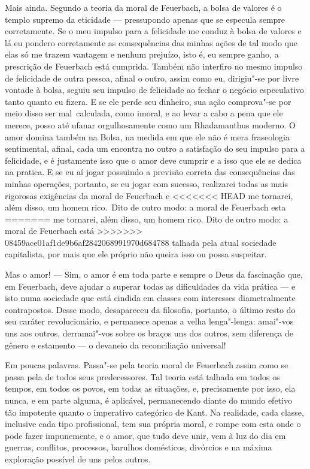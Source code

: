 Mais ainda. Segundo a teoria da moral %
de Feuerbach,
a bolsa de valores é o templo supremo da eticidade --- 
pressupondo apenas que se especula sempre corretamente. Se o meu impulso
para a felicidade me conduz à bolsa de valores e lá eu pondero
corretamente as consequências das minhas ações de tal modo que elas só
me trazem vantagem e nenhum prejuízo, isto é, eu sempre ganho, a
prescrição
de Feuerbach está
cumprida. Também não interfiro no mesmo impulso de felicidade de outra
pessoa, afinal o outro, assim como eu, dirigiu"-se por livre vontade à
bolsa, seguiu seu impulso de felicidade ao fechar o negócio especulativo
tanto quanto eu fizera. E se ele perde seu dinheiro, sua ação
comprova"-se por meio disso ser mal\est\ calculada, como imoral,
e ao levar a cabo a pena que ele merece, posso até
ufanar orgulhosamente como um Rhadamanthus moderno. O amor domina também
na Bolsa, na medida em que ele não é mera fraseologia sentimental,
afinal, cada um encontra no outro a satisfação do seu impulso para a
felicidade, e é justamente isso que o amor deve cumprir e a isso que ele
se dedica na pratica. E se eu aí jogar possuindo a previsão correta das
consequências das minhas operações, portanto, se eu jogar com sucesso,
realizarei todas as mais rigorosas exigências da moral
de Feuerbach e
<<<<<<< HEAD
me tornarei, além disso, um homem rico. \textbar{}\,Dito de outro modo: a moral
de Feuerbach esta
=======
me tornarei, além disso, um homem rico. \textbar{} Dito de outro modo: a moral
de Feuerbach está
>>>>>>> 08459ace01af1de9b6af2842068991970d684788
talhada pela atual sociedade capitalista, por mais que ele próprio não
queira isso ou possa suspeitar.\,\textbar{}

Mas o amor! --- Sim, o amor é em toda parte e sempre o Deus da fascinação
que,
em Feuerbach,
deve ajudar a superar todas as dificuldades da vida prática --- e isto
numa sociedade que está cindida em classes com interesses diametralmente
contrapostos. Desse modo, desapareceu da filosofia, portanto, o último %
resto do seu caráter revolucionário, e permanece apenas a velha
lenga"-lenga: amai"-vos uns aos outros, derramai"-vos sobre os braços uns
dos outros, sem diferença de gênero e estamento --- o devaneio da
reconciliação universal!

Em poucas palavras. Passa"-se pela teoria moral %
de Feuerbach
assim como se passa pela de todos seus predecessores. Tal teoria está
talhada em todos os tempos, em todos os povos, em todas as situações, e,
precisamente por isso, ela nunca, e em parte alguma, é aplicável,
permanecendo diante do mundo efetivo tão impotente quanto o imperativo
categórico
de Kant.
Na realidade, cada classe, inclusive cada tipo profissional, tem sua
própria moral, e rompe com esta onde o pode fazer impunemente, e o amor,
que tudo deve unir, vem à luz do dia em guerras, conflitos, processos,
barulhos domésticos, divórcios e na máxima exploração possível de uns
pelos outros.


